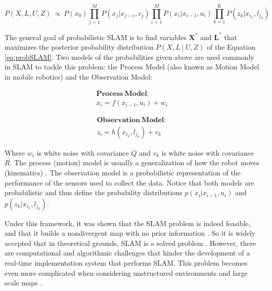 \documentclass[11pt]{article}
\begin{document}
\begin{equation}
P(X,L,U,Z)\ \propto \ P(x_0)\prod_{j=1}^{M}P(x_j|x_{j-c},c_j)\prod_{i=1}^{M}P(x_i|x_{i-1}, u_i)\prod_{k=1}^{K}P(z_k|x_{i_k},l_{j_k})
\label{eq:probSLAM}
\end{equation}

The general goal of probabilistic SLAM is to find variables $\mathbf{X^*}$ and $\mathbf{L^*}$ that maximizes the posterior probability distribution $P(X,L\ |\ U, Z)$ of the Equation \ref{eq:probSLAM}. Two models of the probabilities given above are used commonly in SLAM to tackle this problem: the Process Model (also known as Motion Model in mobile robotics) and the Observation Model:

\noindent
\begin{minipage}{.48\linewidth}
\begin{equation*}
\begin{split}
\mathbf{Process\ Model:} \\ 
x_i = f(x_{i-1}, u_i) + w_i
\end{split}
\end{equation*}
\end{minipage}
\begin{minipage}{.48\linewidth}
\begin{equation*}
\begin{split}
\mathbf{Observation\ Model:} \\ 
z_i = h(x_{i_k}, l_{j_k}) + v_k
\end{split}
\end{equation*}
\end{minipage}
	
Where $w_i$ is white noise with covariance $Q$ and $v_k$ is white noise with covariance $R$. The process (motion) model is usually a generalization of how the robot moves (kinematics) \cite{Montemerlo02fastslam:a}\cite{772544}. The observation model is a probabilistic representation of the performance of the sensors used to collect the data. Notice that both models are probabilistic and thus define the probability distributions $p(x_i|x_{i-1},u_i)$ and $p(z_k|x_{i_k},l_{j_k})$.

Under this framework, it was shown that the SLAM problem is indeed feasible, and that it builds a nondivergent map with no prior information \cite{CsorbaThesis}. So it is widely accepted that in theoretical grounds, SLAM is a solved problem \cite{SLAMPartI}\cite{Cadena}\cite{CsorbaThesis}\cite{938381}. However, there are computational and algorithmic challenges that hinder the development of a real-time implementation system that performs SLAM. This problem becomes even more complicated when considering unstructured environments and large scale maps \cite{SLAMPartII}.
	
\end{document}
